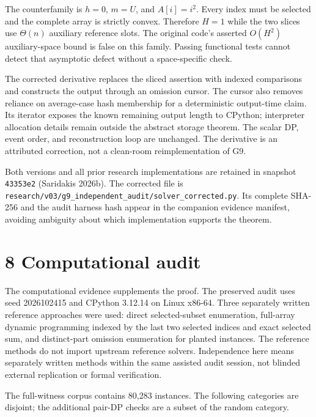\documentclass[
  11pt,
  letterpaper,
]{article}
\begin{document}
The counterfamily is \(h=0\), \(m=U\), and \(A[i]=i^2\). Every index
must be selected and the complete array is strictly convex. Therefore
\(H=1\) while the two slices use \(\Theta(n)\) auxiliary reference
slots. The original code's asserted \(O(H^2)\) auxiliary-space bound is
false on this family. Passing functional tests cannot detect that
asymptotic defect without a space-specific check.

The corrected derivative replaces the sliced assertion with indexed
comparisons and constructs the output through an omission cursor. The
cursor also removes reliance on average-case hash membership for a
deterministic output-time claim. Its iterator exposes the known
remaining output length to CPython; interpreter allocation details
remain outside the abstract storage theorem. The scalar DP, event order,
and reconstruction loop are unchanged. The derivative is an attributed
correction, not a clean-room reimplementation of G9.

Both versions and all prior research implementations are retained in
snapshot \texttt{43353e2} (Saridakis 2026b). The corrected file is
\texttt{research/v03/g9\_independent\_audit/solver\_corrected.py}. Its
complete SHA-256 and the audit harness hash appear in the companion
evidence manifest, avoiding ambiguity about which implementation
supports the theorem.

\hypertarget{computational-audit}{%
\section{8 Computational audit}\label{computational-audit}}

The computational evidence supplements the proof. The preserved audit
uses seed 2026102415 and CPython 3.12.14 on Linux x86-64. Three
separately written reference approaches were used: direct
selected-subset enumeration, full-array dynamic programming indexed by
the last two selected indices and exact selected sum, and distinct-part
omission enumeration for planted instances. The reference methods do not
import upstream reference solvers. Independence here means separately
written methods within the same assisted audit session, not blinded
external replication or formal verification.

The full-witness corpus contains 80,283 instances. The following
categories are disjoint; the additional pair-DP checks are a subset of
the random category.
\end{document}
